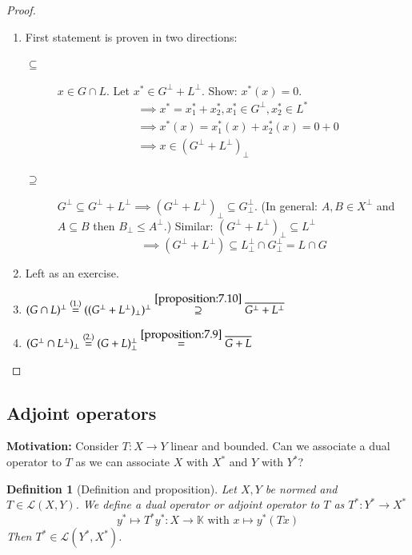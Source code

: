 \documentclass[a4paper]{article}
\newcounter{lecref}[section]
\numberwithin{lecref}{section}
\newtheorem{definition}[lecref]{Definition}
\begin{document}
\begin{proof}
	\begin{enumerate}
		\item First statement is proven in two directions:
			\begin{description}
				\item[$\subseteq$] 
					$x \in G \cap L$. Let $x^* \in G^\bot + L^\bot$. Show: $x^*(x) = 0$.
					\begin{align*}
						&\implies x^* = x_1^* + x_2^*, x_1^* \in G^\bot, x_2^* \in L^* \\
						&\implies x^*(x) = x_1^*(x) + x_2^*(x) = 0 + 0 \\
						&\implies x \in (G^\bot + L^\bot)_\bot
					\end{align*}
				\item[$\supseteq$]
					$G^\bot \subseteq G^\bot + L^\bot \implies (G^\bot + L^\bot)_\bot \subseteq G^\bot_\bot$.
					(In general: $A, B \in X^\bot$ and $A \subseteq B$ then $B_\bot \leq A^\bot$.)
					Similar: $(G^\bot + L^\bot)_\bot \subseteq L^\bot$
					\[ \implies (G^\bot + L^\bot) \subseteq L^\bot_\bot \cap G^\bot_\bot = L \cap G \]
			\end{description}
		\item Left as an exercise.
		\item $(G \cap L)^\bot \overset{(1.)}{=} ((G^\bot + L^\bot)_\bot)^\bot \overset{\ref{proposition:7.10}}{\supseteq} \overline{G^\bot + L^\bot}$
		\item $(G^\bot \cap L^\bot)_\bot \overset{(2.)}{=} (G + L)^\bot_\bot \overset{\ref{proposition:7.9}}{=} \overline{G + L}$
	\end{enumerate}
\end{proof}

\subsection{Adjoint operators}

\textbf{Motivation:} Consider $T: X \to Y$ linear and bounded. Can we associate a dual operator to $T$ as we can associate $X$ with $X^*$ and $Y$ with $Y^*$?

\begin{definition}[Definition and proposition]
	\label{definition:7.11}
	Let $X, Y$ be normed and $T \in \mathcal L(X, Y)$.
	We define a \emph{dual operator} or \emph{adjoint operator} to $T$ as $T^*: Y^* \to X^*$
	\[ y^* \mapsto T^* y^*: X \to \mathbb K \text{ with } x \mapsto y^*(Tx) \]
	Then $T^* \in \mathcal L(Y^*, X^*)$.
\end{definition}
\end{document}
